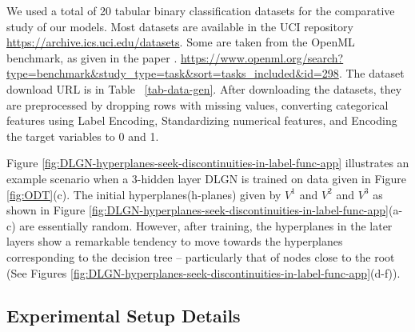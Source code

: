 \documentclass{article} %
\renewcommand{\>}{{\rightarrow}}
\renewcommand{\=}{\stackrel{\triangle}{=}}
\newcommand{\0}{{\mathbf 0}}
\begin{document}
We used a total of 20 tabular binary classification datasets for the comparative study of our models. Most datasets are available in the UCI repository \url{https://archive.ics.uci.edu/datasets}. Some are taken from the OpenML benchmark, as given in the paper \citep{grinsztajn2022tree}. \url{https://www.openml.org/search?type=benchmark&study_type=task&sort=tasks_included&id=298}. The dataset download URL is in Table ~\ref{tab-data-gen}. After downloading the datasets, they are preprocessed by dropping rows with missing values, converting categorical features using Label Encoding, Standardizing numerical features, and Encoding the target variables to 0 and 1.




Figure \ref{fig:DLGN-hyperplanes-seek-discontinuities-in-label-func-app} illustrates an example scenario when a 3-hidden layer DLGN is trained on data given in Figure \ref{fig:ODT}(c). The initial hyperplanes(h-planes) given by $V^1$ and  $V^2$ and $V^3$ as shown in Figure \ref{fig:DLGN-hyperplanes-seek-discontinuities-in-label-func-app}(a-c) are essentially random. However, after training, the hyperplanes in the later layers show a remarkable tendency to move towards the hyperplanes corresponding to the decision tree -- particularly that of nodes close to the root (See Figures \ref{fig:DLGN-hyperplanes-seek-discontinuities-in-label-func-app}(d-f)).




\subsection{Experimental Setup Details}\label{sec:app-exp}
\end{document}
